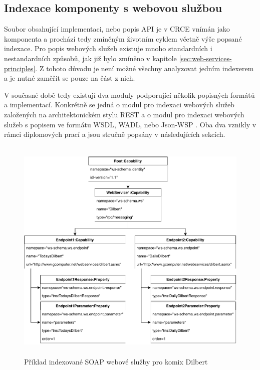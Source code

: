 \documentclass[czech,DP]{thesiskiv}
\begin{document}
\subsection{Indexace komponenty s webovou službou}

Soubor obsahující implementaci, nebo popis API je v CRCE vnímán jako komponenta a prochází tedy zmíněným životním cyklem včetně výše popsané indexace. Pro popis webových služeb existuje mnoho standardních i nestandardních způsobů, jak již bylo zmíněno v kapitole \ref{sec:web-services-principles}. Z tohoto důvodu je není možné všechny analyzovat jedním indexerem a je nutné zaměřit se pouze na část z nich. 

V současné době tedy existují dva moduly podporující několik popisných formátů a implementací. Konkrétně se jedná o modul pro indexaci webových služeb založených na architektonickém stylu REST\cite{hessova2015rest} a o modul pro indexaci webových služeb s popisem ve formátu WSDL, WADL, nebo Json-WSP \cite{pejrimovsky2015ws}. Oba dva vznikly v rámci diplomových prací a jsou stručně popsány v následujících sekcích.


\begin{figure}[h]
	\centering
	\includegraphics[height=11cm]{indexed-api-example}
	\caption{Příklad indexované SOAP webové služby pro komix Dilbert }
	\label{fig:indexed-api-example}
\end{figure}
\end{document}
